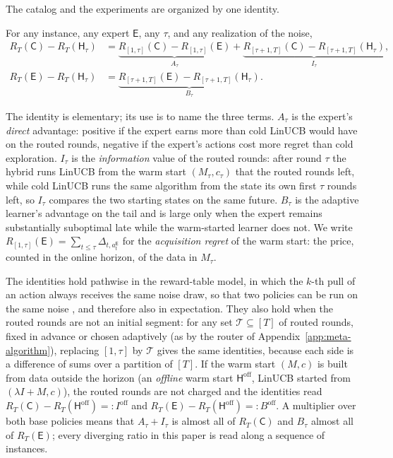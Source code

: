 \documentclass[anon]{alt2027} %
\newcommand{\Cold}{\mathsf{C}}
\newcommand{\Exp}{\mathsf{E}}
\newcommand{\Hyb}{\mathsf{H}}
\begin{document}
The catalog and the experiments are organized by one identity.

\begin{proposition}
\label{prop:decomp}
For any instance, any expert $\Exp$, any $\tau$, and any realization of the
noise,
\begin{align*}
R_T(\Cold)-R_T(\Hyb_\tau)
&=\underbrace{R_{[1,\tau]}(\Cold)-R_{[1,\tau]}(\Exp)}_{A_\tau}
 +\underbrace{R_{[\tau+1,T]}(\Cold)-R_{[\tau+1,T]}(\Hyb_\tau)}_{I_\tau},\\
R_T(\Exp)-R_T(\Hyb_\tau)
&=\underbrace{R_{[\tau+1,T]}(\Exp)-R_{[\tau+1,T]}(\Hyb_\tau)}_{B_\tau}.
\end{align*}
\end{proposition}

The identity is elementary; its use is to name the three terms.
$A_\tau$ is the expert's \emph{direct} advantage: positive if the expert earns
more than cold LinUCB would have on the routed rounds, negative if the expert's
actions cost more regret than cold exploration. $I_\tau$ is the
\emph{information} value of the routed rounds: after round $\tau$ the hybrid
runs LinUCB from the warm start $(M_\tau,c_\tau)$ that the routed rounds left,
while cold LinUCB runs the same algorithm from the state its own first $\tau$
rounds left, so $I_\tau$ compares the two starting states on the same
future. $B_\tau$ is the adaptive learner's advantage on the tail and is large
only when the expert remains substantially suboptimal late while the
warm-started learner does not. We write $R_{[1,\tau]}(\Exp)=\sum_{t\le\tau}\Delta_{t,a_t^{\Exp}}$
for the \emph{acquisition regret} of the warm start: the price, counted in the
online horizon, of the data in $M_\tau$.

\begin{remark}
\label{rem:decomp}
The identities hold pathwise in the reward-table model, in which the $k$-th
pull of an action always receives the same noise draw, so that two policies
can be run on the same noise \citep[\S4.6]{lattimore2020bandit}, and
therefore also in expectation. They also hold when the routed rounds are not
an initial segment: for any set $\mathcal T\subseteq[T]$ of routed rounds,
fixed in advance or chosen adaptively (as by the router of
Appendix~\ref{app:meta-algorithm}), replacing $[1,\tau]$ by $\mathcal T$
gives the same identities, because each side is a difference of sums over a
partition of $[T]$. If the warm start $(M,c)$ is built from data outside the
horizon (an \emph{offline} warm start $\Hyb^{\mathrm{off}}$, LinUCB started
from $(\lambda I+M,c)$), the routed rounds are not charged and the identities
read $R_T(\Cold)-R_T(\Hyb^{\mathrm{off}})=:I^{\mathrm{off}}$ and
$R_T(\Exp)-R_T(\Hyb^{\mathrm{off}})=:B^{\mathrm{off}}$. A multiplier over both
base policies means that $A_\tau+I_\tau$ is almost all of $R_T(\Cold)$ and
$B_\tau$ almost all of $R_T(\Exp)$; every diverging ratio in this paper is
read along a sequence of instances.
\end{remark}
\end{document}
